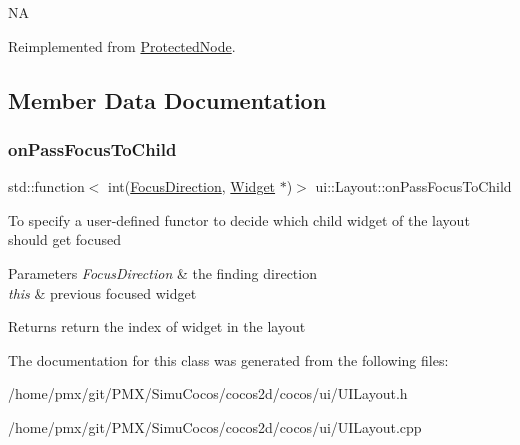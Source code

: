 NA 

Reimplemented from \hyperlink{classProtectedNode_afb1b2f3712d91a38bd5c691eeec6bbb9}{Protected\+Node}.



\subsection{Member Data Documentation}
\mbox{\label{classui_1_1Layout_a9cbbd61aa645a9e719d34f824e83a249}} 
\subsubsection{\texorpdfstring{on\+Pass\+Focus\+To\+Child}{onPassFocusToChild}}
{\footnotesize\ttfamily std\+::function$<$ int(\hyperlink{classui_1_1Widget_a8ae8e8fc793a04a87584205cd1e8a8a5}{Focus\+Direction}, \hyperlink{classui_1_1Widget}{Widget} $\ast$)$>$ ui\+::\+Layout\+::on\+Pass\+Focus\+To\+Child}

To specify a user-\/defined functor to decide which child widget of the layout should get focused 
\begin{DoxyParams}{Parameters}
{\em Focus\+Direction} & the finding direction \\
\hline
{\em this} & previous focused widget \\
\hline
\end{DoxyParams}
\begin{DoxyReturn}{Returns}
return the index of widget in the layout 
\end{DoxyReturn}


The documentation for this class was generated from the following files\+:\begin{DoxyCompactItemize}
\item 
/home/pmx/git/\+P\+M\+X/\+Simu\+Cocos/cocos2d/cocos/ui/U\+I\+Layout.\+h\item 
/home/pmx/git/\+P\+M\+X/\+Simu\+Cocos/cocos2d/cocos/ui/U\+I\+Layout.\+cpp\end{DoxyCompactItemize}
